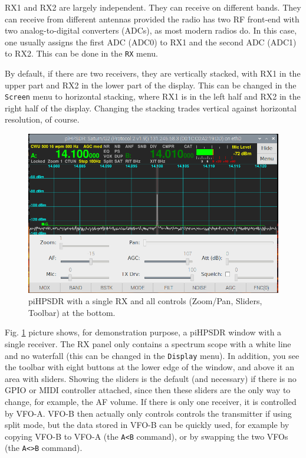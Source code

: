\documentclass[12pt]{book}
\def\bltt#1{\texttt{\color{blue}#1}}
\def\pH{pi\-HPSDR }
\begin{document}
 RX1 and RX2 are largely independent. They can receive on different
 bands. They can receive from different antennas provided the radio
 has two RF front-end with two analog-to-digital converters (ADCs),
 as most modern radios do. In this case, one usually
 assigns the first ADC (ADC0) to RX1 and the second ADC (ADC1) to
 RX2. This can be done in the \bltt{RX} menu.

 By default, if there are two receivers, they are vertically stacked,
 with RX1 in the upper part and RX2 in the lower part of the display.
 This can be changed in the \bltt{Screen} menu to horizontal stacking,
 where RX1 is  in the left half and RX2 in the right half of  the
 display. Changing the stacking trades vertical against horizontal
 resolution, of course.


\begin{figure}[ht]
\center
\includegraphics[width=12cm]{SingleReceiver.png}
\caption{\pH with a single RX and all controls (Zoom/Pan,
Sliders, Toolbar) at the  bottom.}
\label{fig:SingleReceiver}
\end{figure}

 Fig. \ref{fig:SingleReceiver} picture shows, for demonstration purpose, a \pH
 window with a single receiver.
 The RX panel only contains a
 spectrum scope with a white line and no waterfall (this can be changed in the
 \bltt{Display} menu). In addition, you see the toolbar
 with eight buttons at the lower edge of the window, and above
 it an area with sliders. Showing the sliders is the default
 (and necessary) if there is no GPIO or MIDI controller attached,
 since then these sliders are the only way to change, for example,
 the AF volume. If there is only one receiver, it is controlled
 by VFO-A. VFO-B then actually only controls controls the transmitter
 if using split mode, but the data stored in VFO-B can
 be quickly used, for example by copying VFO-B to VFO-A (the
 \bltt{A<B} command), or by swapping the two VFOs (the \bltt{A<>B} command).
\end{document}

